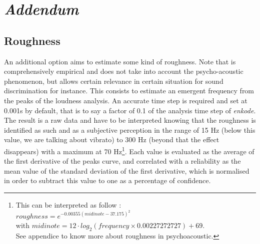 \section{\textit{Addendum}}
\subsection*{Roughness}

An additional option aims to estimate some kind of roughness. Note that is comprehensively empirical and does not take into account the psycho-acoustic phenomenon, but allows certain relevance in certain situation for sound discrimination for instance. This consists to estimate an emergent frequency from the peaks of the loudness analysis. An accurate time step is required and set at 0.001s by default, that is to say a factor of 0.1 of the analysis time step of \textsl{enkode}. The result is a raw data and have to be interpreted knowing that the roughness is identified as such and as a subjective perception in the range of 15 Hz (below this value, we are talking about vibrato) to 300 Hz (beyond that the effect disappears) with a maximum at 70 Hz\footnote{This can be interpreted as follow :\\ \indent \quad $roughness = e^{-0.00355 (midinote-37.175)^2}$\\ \indent \quad with $midinote=12 \cdot log_2(frequency \times 0.00227272727) + 69$.\\ \indent See appendice  to know more about roughness in psychoacoustic.}. Each value is evaluated as the average of the first derivative of the peaks curve, and correlated with a reliability as the mean value of the standard deviation of the first derivative, which is normalised in order to subtract this value to one as a percentage of confidence.
